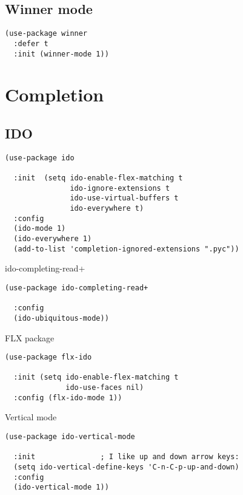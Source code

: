 \documentclass[12pt]{article}
\begin{document}
\subsection{Winner mode}
\label{sec:orgf7a0324}

\begin{verbatim}
(use-package winner
  :defer t
  :init (winner-mode 1))
\end{verbatim}

\section{Completion}
\label{sec:org5ce00bc}
\subsection{IDO}
\label{sec:org7b7b0af}

\begin{verbatim}
(use-package ido

  :init  (setq ido-enable-flex-matching t
               ido-ignore-extensions t
               ido-use-virtual-buffers t
               ido-everywhere t)
  :config
  (ido-mode 1)
  (ido-everywhere 1)
  (add-to-list 'completion-ignored-extensions ".pyc"))

\end{verbatim}
ido-completing-read+
\begin{verbatim}
(use-package ido-completing-read+

  :config
  (ido-ubiquitous-mode))
\end{verbatim}

FLX package
\begin{verbatim}
(use-package flx-ido

  :init (setq ido-enable-flex-matching t
              ido-use-faces nil)
  :config (flx-ido-mode 1))

\end{verbatim}

Vertical mode
\begin{verbatim}
(use-package ido-vertical-mode

  :init               ; I like up and down arrow keys:
  (setq ido-vertical-define-keys 'C-n-C-p-up-and-down)
  :config
  (ido-vertical-mode 1))

\end{verbatim}
\end{document}
